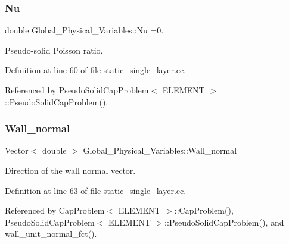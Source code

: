 \subsubsection{\texorpdfstring{Nu}{Nu}}
{\footnotesize\ttfamily double Global\+\_\+\+Physical\+\_\+\+Variables\+::\+Nu =0.}



Pseudo-\/solid Poisson ratio. 



Definition at line 60 of file static\+\_\+single\+\_\+layer.\+cc.



Referenced by Pseudo\+Solid\+Cap\+Problem$<$ E\+L\+E\+M\+E\+N\+T $>$\+::\+Pseudo\+Solid\+Cap\+Problem().

\mbox{\label{namespaceGlobal__Physical__Variables_af3a3b98f9f5b354d01228884e49c5bf0}} 
\subsubsection{\texorpdfstring{Wall\+\_\+normal}{Wall\_normal}}
{\footnotesize\ttfamily Vector$<$ double $>$ Global\+\_\+\+Physical\+\_\+\+Variables\+::\+Wall\+\_\+normal}



Direction of the wall normal vector. 



Definition at line 63 of file static\+\_\+single\+\_\+layer.\+cc.



Referenced by Cap\+Problem$<$ E\+L\+E\+M\+E\+N\+T $>$\+::\+Cap\+Problem(), Pseudo\+Solid\+Cap\+Problem$<$ E\+L\+E\+M\+E\+N\+T $>$\+::\+Pseudo\+Solid\+Cap\+Problem(), and wall\+\_\+unit\+\_\+normal\+\_\+fct().

